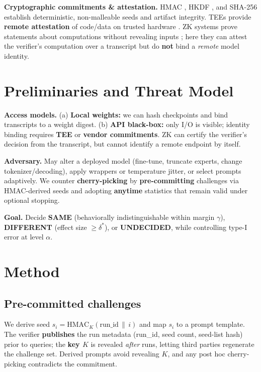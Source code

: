 \documentclass{article}
\begin{document}
\textbf{Cryptographic commitments \& attestation.} HMAC \cite{rfc2104}, HKDF \cite{rfc5869}, and SHA-256 \cite{fips180-4} establish deterministic, non-malleable seeds and artifact integrity. TEEs provide \textbf{remote attestation} of code/data on trusted hardware \cite{costan2016sgx}. ZK systems prove statements about computations without revealing inputs \cite{bensasson2014snarks,bunz2018bulletproofs}; here they can attest the verifier's computation over a transcript but do \textbf{not} bind a \emph{remote} model identity.

\section{Preliminaries and Threat Model}

\textbf{Access models.} (a) \textbf{Local weights:} we can hash checkpoints and bind transcripts to a weight digest. (b) \textbf{API black-box:} only I/O is visible; identity binding requires \textbf{TEE} or \textbf{vendor commitments}. ZK can certify the verifier's decision from the transcript, but cannot identify a remote endpoint by itself.

\textbf{Adversary.} May alter a deployed model (fine-tune, truncate experts, change tokenizer/decoding), apply wrappers or temperature jitter, or select prompts adaptively. We counter \textbf{cherry-picking} by \textbf{pre-committing} challenges via HMAC-derived seeds and adopting \textbf{anytime} statistics that remain valid under optional stopping.

\textbf{Goal.} Decide \textbf{SAME} (behaviorally indistinguishable within margin $\gamma$), \textbf{DIFFERENT} (effect size $\geq \delta^*$), or \textbf{UNDECIDED}, while controlling type-I error at level $\alpha$.

\section{Method}

\subsection{Pre-committed challenges}

We derive seed $s_i = \mathrm{HMAC}_{K}(\text{run\_id}\,\|\,i)$ \cite{rfc2104} and map $s_i$ to a prompt template. The verifier \textbf{publishes} the run metadata (run\_id, seed count, seed-list hash) prior to queries; the \textbf{key $K$} is revealed \emph{after} runs, letting third parties regenerate the challenge set. Derived prompts avoid revealing $K$, and any post hoc cherry-picking contradicts the commitment.
\end{document}

